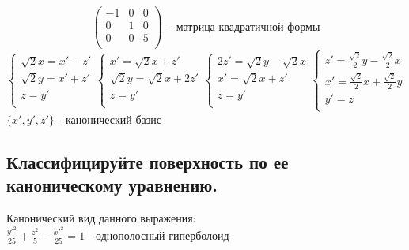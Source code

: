 \documentclass{article}
\begin{document}
    
    \begin{equation*}
        \begin{pmatrix}
            -1& 0& 0\\
            0& 1& 0\\
            0& 0& 5\\
        \end{pmatrix}
        - \text{матрица квадратичной формы}
    \end{equation*}
    \begin{equation*}
        \begin{cases}
            \sqrt{2}x=x'-z'\\
            \sqrt{2}y=x'+z'\\
            z=y'\\
        \end{cases}
        \begin{cases}
            x'=\sqrt{2}x+z'\\
            \sqrt{2}y=\sqrt{2}x+2z'\\
            z=y'\\
        \end{cases}
        \begin{cases}
            2z'=\sqrt{2}y-\sqrt{2}x\\
            x'=\sqrt{2}x+z'\\
            z = y'\\
        \end{cases}
        \begin{cases}
            z'=\frac{\sqrt{2}}{2}y-\frac{\sqrt{2}}{2}x\\
            x'=\frac{\sqrt{2}}{2}x+\frac{\sqrt{2}}{2}y\\
            y'=z\\
        \end{cases}
    \end{equation*}
    $\{x', y', z'\}$ - канонический базис\\
    
    \subsection{Классифицируйте поверхность по ее каноническому уравнению.}
    Канонический вид данного выражения:\\
    $\frac{y'^2}{25} + \frac{z^2}{5} - \frac{x'^2}{25} = 1$ - однополосный гиперболоид \\
\end{document}
